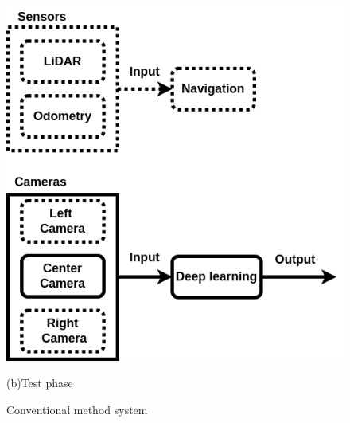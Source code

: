 \begin{figure}[h]
  \centering
  \includegraphics[keepaspectratio, scale=0.36]{images/old-method2.png}
  \caption*{(b)Test phase}
  \caption{Conventional method system}
  \label{Fig:conv-method}
  \end{figure}


